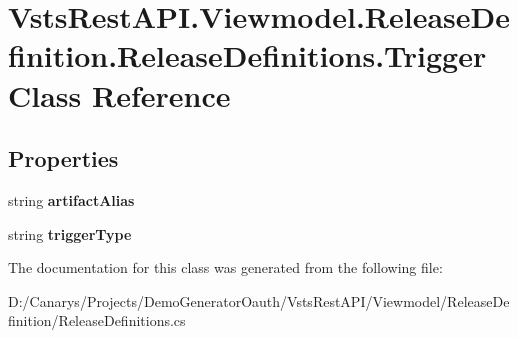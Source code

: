 \hypertarget{class_vsts_rest_a_p_i_1_1_viewmodel_1_1_release_definition_1_1_release_definitions_1_1_trigger}{}\section{Vsts\+Rest\+A\+P\+I.\+Viewmodel.\+Release\+Definition.\+Release\+Definitions.\+Trigger Class Reference}
\label{class_vsts_rest_a_p_i_1_1_viewmodel_1_1_release_definition_1_1_release_definitions_1_1_trigger}
\subsection*{Properties}
\begin{DoxyCompactItemize}
\item 
\mbox{\label{class_vsts_rest_a_p_i_1_1_viewmodel_1_1_release_definition_1_1_release_definitions_1_1_trigger_ab480ceb4bb66161466afb019885cc62d}} 
string {\bfseries artifact\+Alias}
\item 
\mbox{\label{class_vsts_rest_a_p_i_1_1_viewmodel_1_1_release_definition_1_1_release_definitions_1_1_trigger_a5aaf3640c2334fbed82b4987a0e3ab22}} 
string {\bfseries trigger\+Type}
\end{DoxyCompactItemize}


The documentation for this class was generated from the following file\+:\begin{DoxyCompactItemize}
\item 
D\+:/\+Canarys/\+Projects/\+Demo\+Generator\+Oauth/\+Vsts\+Rest\+A\+P\+I/\+Viewmodel/\+Release\+Definition/Release\+Definitions.\+cs\end{DoxyCompactItemize}
